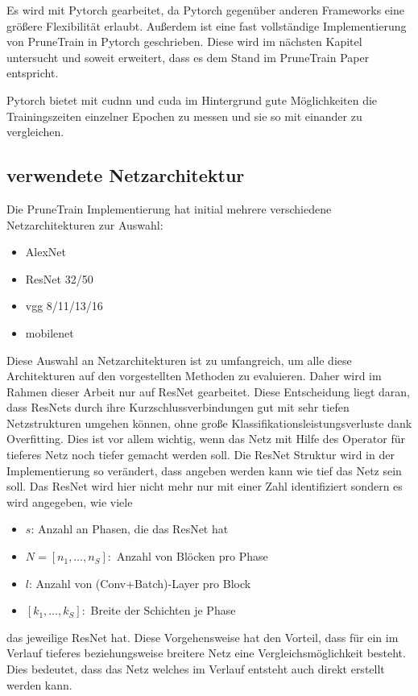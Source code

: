 Es wird mit Pytorch gearbeitet, da Pytorch gegenüber anderen Frameworks eine größere Flexibilität erlaubt. Außerdem ist eine fast vollständige Implementierung von PruneTrain in Pytorch geschrieben. Diese wird im nächsten Kapitel untersucht und soweit erweitert, dass es dem Stand im PruneTrain Paper entspricht.

Pytorch bietet mit cudnn und cuda im Hintergrund gute Möglichkeiten die Trainingszeiten einzelner Epochen zu messen und sie so mit einander zu vergleichen.


\subsection{verwendete Netzarchitektur}\label{sec:archi}
Die PruneTrain Implementierung hat initial mehrere verschiedene Netzarchitekturen zur Auswahl:
\begin{itemize}
 \item AlexNet
 \item ResNet 32/50
 \item vgg 8/11/13/16
 \item mobilenet
\end{itemize}

Diese Auswahl an Netzarchitekturen ist zu umfangreich, um alle diese Architekturen auf den vorgestellten Methoden zu evaluieren. Daher wird im Rahmen dieser Arbeit nur auf ResNet gearbeitet. Diese Entscheidung liegt daran, dass ResNets durch ihre Kurzschlussverbindungen gut mit sehr tiefen Netzstrukturen umgehen können, ohne große Klassifikationsleistungsverluste dank Overfitting. Dies ist vor allem wichtig, wenn das Netz mit Hilfe des Operator für tieferes Netz noch tiefer gemacht werden soll. Die ResNet Struktur wird in der Implementierung so verändert, dass angeben werden kann wie tief das Netz sein soll. Das ResNet wird hier nicht mehr nur mit einer Zahl identifiziert sondern es wird angegeben, wie viele
\begin{itemize}
 \item $s$: Anzahl an Phasen, die das ResNet hat
 \item $N=[n_1, \ldots, n_S]:$ Anzahl von Blöcken pro Phase 
 \item $l$: Anzahl von (Conv+Batch)-Layer pro Block
 \item $[k_1, \ldots,k_S ]:$ Breite der Schichten je Phase
\end{itemize}
das jeweilige ResNet hat. Diese Vorgehensweise hat den Vorteil, dass für ein im Verlauf tieferes beziehungsweise breitere Netz eine Vergleichsmöglichkeit besteht. Dies bedeutet, dass das Netz welches im Verlauf entsteht auch direkt erstellt werden kann.



